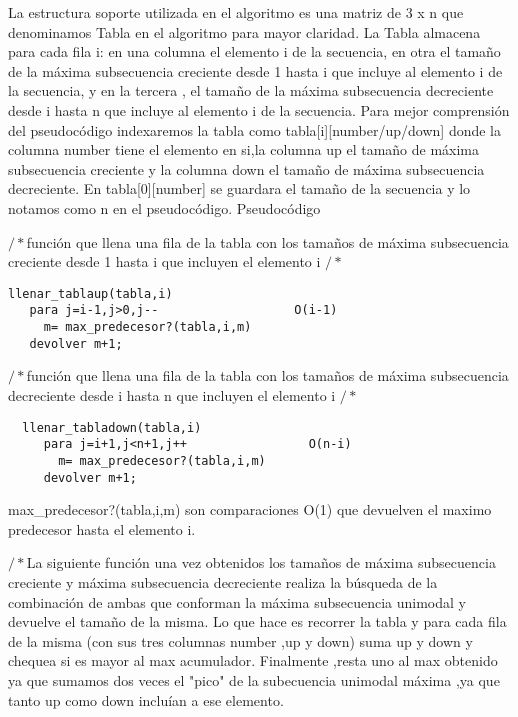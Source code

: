La estructura soporte utilizada en el algoritmo es una matriz de 3 x n que denominamos Tabla en el algoritmo para mayor claridad.
\newline
La Tabla almacena para cada fila i: en una columna el elemento  i de la secuencia, en otra el tamaño de la máxima subsecuencia creciente desde 1 hasta i que incluye al elemento i de la secuencia, y en la tercera , el tamaño de la máxima subsecuencia decreciente desde  i hasta n que incluye al elemento i de la secuencia.
\newline
Para mejor comprensión del pseudocódigo indexaremos la tabla como tabla[i][number/up/down] donde la columna number  tiene el elemento en si,la columna up el tamaño de máxima subsecuencia creciente y la columna down el tamaño de máxima subsecuencia decreciente.
En tabla[0][number] se guardara el tamaño de la secuencia y lo notamos como n en el pseudocódigo.
\newline
Pseudocódigo

$/*$función que llena una fila de la tabla con los tamaños de máxima subsecuencia creciente desde 1 hasta i que incluyen el elemento i  $/*$

\begin{verbatim}                        
llenar_tablaup(tabla,i)           
   para j=i-1,j>0,j--                   O(i-1)   
     m= max_predecesor?(tabla,i,m) 	
   devolver m+1;
\end{verbatim}    
        

$/*$función que llena una fila de la tabla con los tamaños de máxima subsecuencia decreciente desde i hasta n que incluyen el elemento i $/*$ 
       
\begin{verbatim}                        
  llenar_tabladown(tabla,i)             
     para j=i+1,j<n+1,j++                 O(n-i) 
       m= max_predecesor?(tabla,i,m) 	 
     devolver m+1;
\end{verbatim} 

max\_predecesor?(tabla,i,m) son comparaciones O(1) que devuelven el maximo predecesor hasta el elemento i. 

$/*$La siguiente función una vez obtenidos los tamaños de máxima subsecuencia creciente y máxima subsecuencia decreciente realiza la búsqueda de la combinación de ambas que conforman la máxima subsecuencia unimodal y devuelve el tamaño de la misma.
Lo que hace es recorrer la tabla y para cada fila de la misma (con sus tres columnas number ,up y down) suma up y down y chequea si es mayor al max acumulador.
Finalmente ,resta uno al max obtenido ya que sumamos dos veces el "pico" de la subecuencia unimodal máxima ,ya que tanto up como down incluían a ese elemento. 

